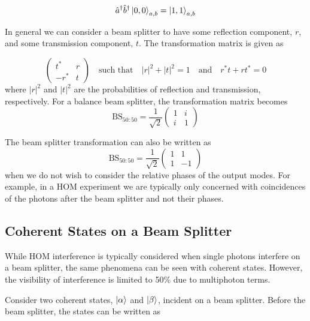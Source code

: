 \begin{equation}
	\hat{a}^\dagger \hat{b}^\dagger \ket{0,0}_{a,b} = \ket{1,1}_{a,b}
\end{equation}

In general we can consider a beam splitter to have some reflection component, $r$, and some transmission component, $t$. The transformation matrix is given as 

\begin{equation}
	\left(
	\begin{matrix}
		t^\ast & r \\
		-r^\ast & t
	\end{matrix}
	\right)
	\quad\text{such that}\quad
	|r|^2 + |t|^2 = 1 
	\quad\text{and}\quad
	r^\ast t + r t^\ast = 0
\end{equation}
where $|r|^2$ and $|t|^2$ are the probabilities of reflection and transmission, respectively. For a balance beam splitter, the transformation matrix becomes
\begin{equation}
	\text{BS}_{50:50} = \frac{1}{\sqrt{2}}
	\left(
	\begin{matrix}
		1 & i \\
		i & 1
	\end{matrix}
	\right)	
\end{equation}

The beam splitter transformation can also be written as 
\begin{equation}
	\text{BS}_{50:50} = \frac{1}{\sqrt{2}}
	\left(
	\begin{matrix}
		1 & 1 \\
		1 & -1
	\end{matrix}
	\right)	
\end{equation}
when we do not wish to consider the relative phases of the output modes. For example, in a \ac{HOM} experiment we are typically only concerned with coincidences of the photons after the beam splitter and not their phases.

\subsection{Coherent States on a Beam Splitter}

While \ac{HOM} interference is typically considered when single photons interfere on a beam splitter, the same phenomena can be seen with coherent states.  However, the visibility of interference is limited to 50\% \cite{Rarity2005} due to multiphoton terms.

Consider two coherent states, $\ket{\alpha}$ and $\ket{\beta}$, incident on a beam splitter. Before the beam splitter, the states can be written as

